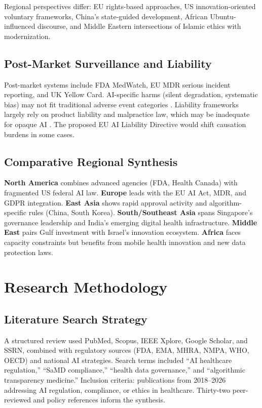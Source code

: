 \documentclass[12pt,a4paper]{report}
\begin{document}
Regional perspectives differ: EU rights-based approaches, US innovation-oriented voluntary frameworks, China's state-guided development, African Ubuntu-influenced discourse, and Middle Eastern intersections of Islamic ethics with modernization.

\section{Post-Market Surveillance and Liability}

Post-market systems include FDA MedWatch, EU MDR serious incident reporting, and UK Yellow Card. AI-specific harms (silent degradation, systematic bias) may not fit traditional adverse event categories \cite{petersen2022}. Liability frameworks largely rely on product liability and malpractice law, which may be inadequate for opaque AI \cite{price2019}. The proposed EU AI Liability Directive would shift causation burdens in some cases.

\section{Comparative Regional Synthesis}

\textbf{North America} combines advanced agencies (FDA, Health Canada) with fragmented US federal AI law. \textbf{Europe} leads with the EU AI Act, MDR, and GDPR integration. \textbf{East Asia} shows rapid approval activity and algorithm-specific rules (China, South Korea). \textbf{South/Southeast Asia} spans Singapore's governance leadership and India's emerging digital health infrastructure. \textbf{Middle East} pairs Gulf investment with Israel's innovation ecosystem. \textbf{Africa} faces capacity constraints but benefits from mobile health innovation and new data protection laws.

\chapter{Research Methodology}
\label{ch:method}

\section{Literature Search Strategy}

A structured review used PubMed, Scopus, IEEE Xplore, Google Scholar, and SSRN, combined with regulatory sources (FDA, EMA, MHRA, NMPA, WHO, OECD) and national AI strategies. Search terms included ``AI healthcare regulation,'' ``SaMD compliance,'' ``health data governance,'' and ``algorithmic transparency medicine.'' Inclusion criteria: publications from 2018--2026 addressing AI regulation, compliance, or ethics in healthcare. Thirty-two peer-reviewed and policy references inform the synthesis.
\end{document}

